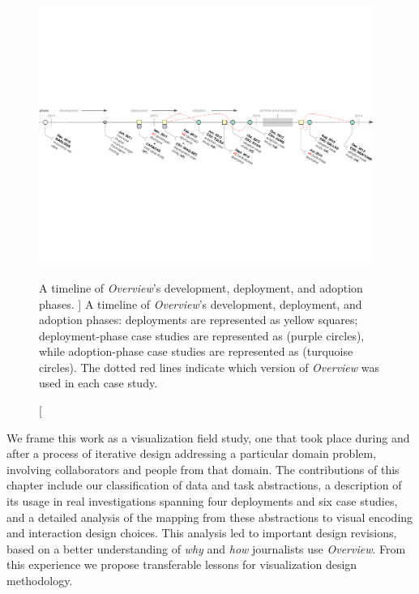 \begin{figure}
	\centering
	\includegraphics[width=0.975\textwidth]{figures/timeline.pdf}
	\caption
	[
	    A timeline of \textsl{Overview}'s development, deployment, and adoption phases.
	]
	{
	    A timeline of \textsl{Overview}'s development, deployment, and adoption phases: deployments are represented as yellow squares; deployment-phase case studies are represented as  (purple circles), while adoption-phase case studies are represented as  (turquoise circles).
	    The dotted red lines indicate which version of \textsl{Overview} was used in each case study.
	}
	\centering
	\label{overview:fig:timeline}
\end{figure}


We frame this work as a visualization field study, one that took place during and after a process of iterative design addressing a particular domain problem, involving collaborators and people from that domain.
The contributions of this chapter include our classification of data and task abstractions, a description of its usage in real investigations spanning four deployments and six case studies, and a detailed analysis of the mapping from these abstractions to visual encoding and interaction design choices.
This analysis led to important design revisions, based on a better understanding of {\it why} and {\it how} journalists use {\it Overview}. 
From this experience we propose transferable lessons for visualization design methodology.

